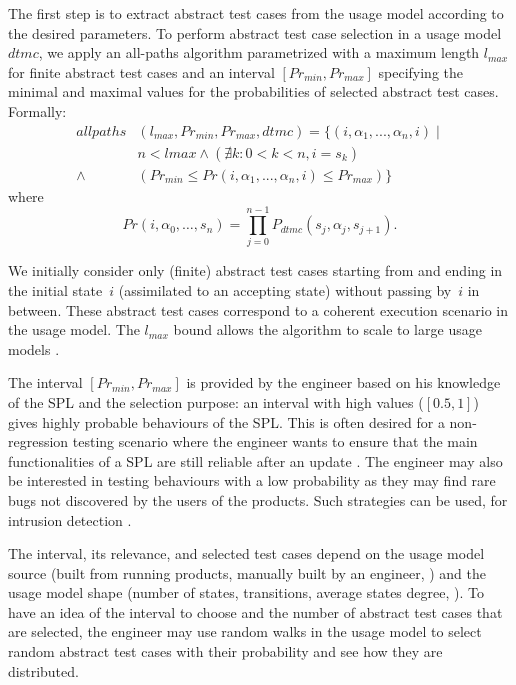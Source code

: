 The first step is to extract abstract test cases from the usage model according to the desired parameters. 
To perform abstract test case selection in a usage model $dtmc$, we apply an all-paths algorithm parametrized with a maximum length $l_{max}$ for finite abstract test cases and an interval $[Pr_{min} , Pr_{max}]$ specifying the minimal and maximal values for the probabilities of selected abstract test cases. 
Formally: 
\begin{align*}
    allpaths & (l_{max} , Pr_{min}, Pr_{max}, dtmc) =
        \{(i,\alpha_1 , ... , \alpha_{n}, i) \mid \\ 
        & n < lmax \wedge ( \nexists k : 0 < k < n, i = s_k ) \\
 \wedge &  (Pr_{min} \leq Pr(i,\alpha_1 , ... , \alpha_{n}, i) \leq Pr_{max})\}
\end{align*}
where 
$$Pr(i, \alpha_0, \dots, s_n) =\prod_{j=0}^{n-1} P_{dtmc}(s_j, \alpha_j , s_{j+1}).$$

We initially consider only (finite) abstract test cases starting from and ending in the initial state~$i$ (assimilated to an accepting state) without passing by~$i$ in between.  These abstract test cases correspond to a coherent execution scenario in the usage model. The $l_{max}$ bound allows the algorithm to scale to large usage models \cite{Devroey2014}.

The interval $[Pr_{min} , Pr_{max}]$ is provided by the engineer based on his knowledge of the SPL and the selection purpose: an interval with high values (\eg $[0.5 , 1]$) gives highly probable behaviours of the SPL. This is often desired for a non-regression testing scenario where the engineer wants to ensure that the main functionalities of a SPL are still  reliable after an update \cite{Mathur2008}. 
The engineer may also be interested in testing behaviours with a low probability as they may find rare bugs not discovered by the users of the products. Such strategies can be used, \eg for intrusion detection \cite{GarciaTeodoro2009}. 

The interval, its relevance, and selected test cases depend on the usage model source (\eg built from running products, manually built by an engineer, \etc) and the usage model shape (\ie number of states, transitions, average states degree, \etc). To have an idea of the interval to choose and the number of abstract test cases that are selected, the engineer may use random walks in the usage model to select random abstract test cases with their probability and see how they are distributed.

